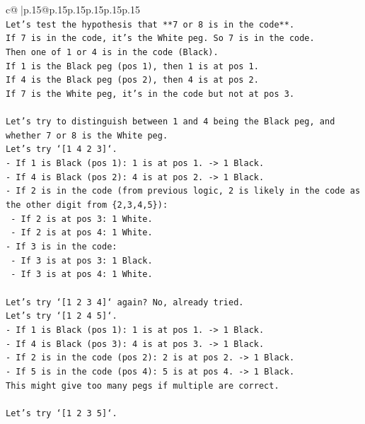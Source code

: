 \documentclass{article}
\begin{document}
{\begin{supertabular}{c@{$\;$}|p{.15\linewidth}@{}p{.15\linewidth}p{.15\linewidth}p{.15\linewidth}p{.15\linewidth}p{.15\linewidth}}
{{{\\ 
\texttt{Let's test the hypothesis that **7 or 8 is in the code**.} \\
\texttt{If 7 is in the code, it's the White peg. So 7 is in the code.} \\
\texttt{Then one of 1 or 4 is in the code (Black).} \\
\texttt{If 1 is the Black peg (pos 1), then 1 is at pos 1.} \\
\texttt{If 4 is the Black peg (pos 2), then 4 is at pos 2.} \\
\texttt{If 7 is the White peg, it's in the code but not at pos 3.} \\
\\ 
\texttt{Let's try to distinguish between 1 and 4 being the Black peg, and whether 7 or 8 is the White peg.} \\
\texttt{Let's try `{[}1 4 2 3{]}`.} \\
\texttt{{-} If 1 is Black (pos 1): 1 is at pos 1. {-}> 1 Black.} \\
\texttt{{-} If 4 is Black (pos 2): 4 is at pos 2. {-}> 1 Black.} \\
\texttt{{-} If 2 is in the code (from previous logic, 2 is likely in the code as the other digit from \{2,3,4,5\}):} \\
\texttt{  {-} If 2 is at pos 3: 1 White.} \\
\texttt{  {-} If 2 is at pos 4: 1 White.} \\
\texttt{{-} If 3 is in the code:} \\
\texttt{  {-} If 3 is at pos 3: 1 Black.} \\
\texttt{  {-} If 3 is at pos 4: 1 White.} \\
\\ 
\texttt{Let's try `{[}1 2 3 4{]}` again? No, already tried.} \\
\texttt{Let's try `{[}1 2 4 5{]}`.} \\
\texttt{{-} If 1 is Black (pos 1): 1 is at pos 1. {-}> 1 Black.} \\
\texttt{{-} If 4 is Black (pos 3): 4 is at pos 3. {-}> 1 Black.} \\
\texttt{{-} If 2 is in the code (pos 2): 2 is at pos 2. {-}> 1 Black.} \\
\texttt{{-} If 5 is in the code (pos 4): 5 is at pos 4. {-}> 1 Black.} \\
\texttt{This might give too many pegs if multiple are correct.} \\
\\ 
\texttt{Let's try `{[}1 2 3 5{]}`.} \\
}}}
\end{supertabular}}
\end{document}
